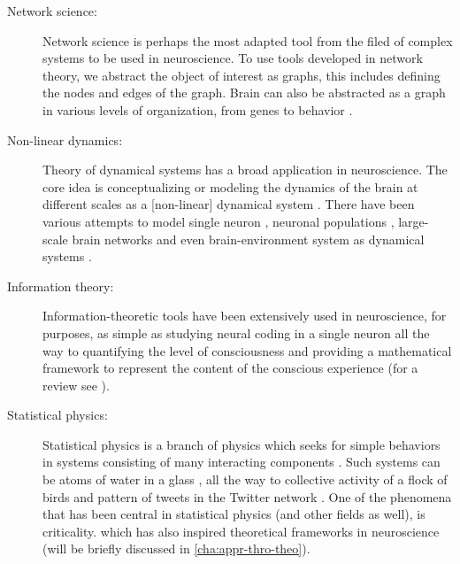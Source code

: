 \begin{description}
\item[Network science:]
  Network science is perhaps the most adapted tool from the filed of complex systems to be used in neuroscience.
  To use tools developed in network theory, 
  we abstract the object of interest as graphs,
  this includes defining the nodes and edges of the graph.
  Brain can also be abstracted as a graph in various levels of organization,
  from genes to behavior \cite{borsboomSmallWorldPsychopathology2011,bullmoreComplexBrainNetworks2009a,vandenheuvelSpotlightBridgingMicroscale2017,scholtensMultimodalConnectomicsPsychiatry2018,vandenheuvelMultiscaleNeurosciencePsychiatric2019,heuvelCrossdisorderConnectomeLandscape2019}.
\item[Non-linear dynamics:]
  Theory of dynamical systems has a broad application in neuroscience.
  The core idea is conceptualizing or modeling the dynamics of the brain at different scales as a [non-linear] dynamical system \cite{mckennaBrainDynamicPhysical1994,beerDynamicalSystemsPerspective1995,rabinovichDynamicalPrinciplesNeuroscience2006}.
  There have been various attempts to model single neuron \cite{izhikevichDynamicalSystemsNeuroscience2010}, neuronal populations \cite[Part 3]{gerstnerNeuronalDynamicsSingle2014}\cite{decoDynamicBrainSpiking2008}, large-scale brain networks \cite{izhikevichLargescaleModelMammalian2008,decoEmergingConceptsDynamical2011} and even brain-environment system as dynamical systems \cite{beerDynamicalSystemsPerspective1995}.
\item[Information theory:]
  Information-theoretic tools have been extensively used in neuroscience,
  for purposes, as simple as studying neural coding in a single neuron
  \cite{bialekReadingNeuralCode1991,steveninckReproducibilityVariabilityNeural1997,strongEntropyInformationNeural1998,borstInformationTheoryNeural1999,fredriekeSpikesExploringNeural1999}
  all the way to quantifying the level of consciousness
  \cite{tononiInformationIntegrationTheory2004,balduzziIntegratedInformationDiscrete2008b,oizumiPhenomenologyMechanismsConsciousness2014}
  and providing a mathematical framework to represent the content of the conscious experience \cite{balduzziQualiaGeometryIntegrated2009b}
  (for a review see \citet{tononiIntegratedInformationTheory2016}).
\item[Statistical physics:]
  Statistical physics is a branch of physics which seeks for simple behaviors in systems consisting of many interacting components \cite{sethnaStatisticalMechanicsEntropy2006}.
  Such systems can be atoms of water in a glass \cite{sethnaStatisticalMechanicsEntropy2006},
  all the way to collective activity of a flock of birds
  \cite{bialekStatisticalMechanicsNatural2012,bialekSocialInteractionsDominate2014}
  and pattern of tweets in the Twitter network \cite{hallStatisticalMechanicsTwitter2019}.
  One of the phenomena that has been central in statistical physics (and other fields as well),
  is criticality.
  which has also inspired theoretical frameworks in neuroscience \cite{munozColloquiumCriticalityDynamical2018} (will be briefly discussed in \autoref{cha:appr-thro-theo}).
\end{description}

